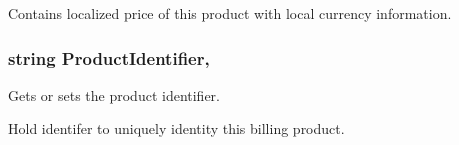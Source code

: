 Contains localized price of this product with local currency information.\hypertarget{class_voxel_busters_1_1_native_plugins_1_1_billing_product_a318cd56e0b5431348b89762286588f95}{}
\subsubsection[{Product\+Identifier}]{\setlength{\rightskip}{0pt plus 5cm}string Product\+Identifier\hspace{0.3cm}{\ttfamily [get]}, {}}\label{class_voxel_busters_1_1_native_plugins_1_1_billing_product_a318cd56e0b5431348b89762286588f95}


Gets or sets the product identifier. 

Hold identifer to uniquely identity this billing product.